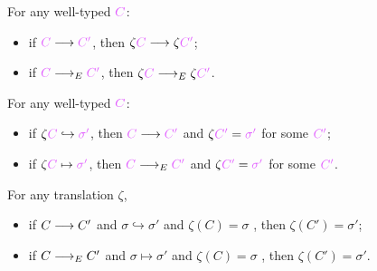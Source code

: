\documentclass[main.tex]{subfiles}
\begin{document}
\begin{theorem}[Simulation]
  For any well-typed $\tm{C}$:
  \begin{itemize}
  \item 
    if $\tm{C}\red\tm{C'}$, then $\tm{\trans{C}}\red\tm{\trans{C'}}$;
  \item
    if $\tm{C}\rede\tm{C'}$, then $\tm{\trans{C}}\rede\tm{\trans{C'}}$.
  \end{itemize}
\end{theorem}

\begin{theorem}[Reflection]
  For any well-typed $\tm{C}$:
  \begin{itemize}
  \item
    if $\tm{\trans{C}}\lred\tm{\sigma'}$, then $\tm{C}\red\tm{C'}$ and $\tm{\trans{C'}}=\tm{\sigma'}$ for some $\tm{C'}$;
  \item
    if $\tm{\trans{C}}\lrede\tm{\sigma'}$, then $\tm{C}\rede\tm{C'}$ and $\tm{\trans{C'}}=\tm{\sigma'}$ for some $\tm{C'}$.
  \end{itemize}
\end{theorem}


\begin{lemma}
  For any translation $\zeta$,
  \begin{itemize}
    \item if $C \longrightarrow C'$ and $\sigma \hookrightarrow \sigma'$ and $\zeta(C) =
      \sigma$ , then $\zeta(C') = \sigma'$;
    \item if $C \longrightarrow_{E} C'$ and $\sigma \mapsto \sigma'$ and $\zeta(C) =
      \sigma$ , then $\zeta(C') = \sigma'$.
  \end{itemize}
\end{lemma}
\end{document}
